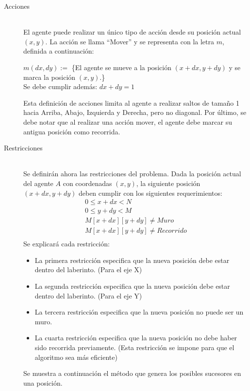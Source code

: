 \documentclass[letter, titlepage, 10pt]{article}
\begin{document}
\begin{description}
    \newpage  
    \item[Acciones] \hfill \\
  El agente puede realizar un único tipo de acción desde su posición actual $(x,y)$. La acción se llama ``Mover'' y se representa con la letra $m$, definida a continuación:
  \begin{center}
    $m(dx,dy) :=$ \{El agente se mueve a la posición $(x+dx,y+dy)$ y se marca la posición $(x,y)$.\}\\
    Se debe cumplir además: $dx + dy = 1$\\
  \end{center}
  Esta definición de acciones limita al agente a realizar saltos de tamaño 1 hacia Arriba, Abajo, Izquierda y Derecha, pero no diagonal. Por último, se debe notar que al realizar una acción mover, el agente debe marcar su antigua posición como recorrida.
  
  \item[Restricciones] \hfill \\
    Se definirán ahora las restricciones del problema. Dada la posición actual del agente $A$ con coordenadas $(x,y)$, la siguiente posición $(x+dx,y+dy)$  deben cumplir con los siguientes requerimientos:
  \begin{align}
    0 \leq x+dx < N\\
    0 \leq y+dy < M\\
    M[x+dx][y+dy] \neq Muro\\
    M[x+dx][y+dy] \neq Recorrido\\
  \end{align}
  Se explicará cada restricción:
  \begin{itemize}
    \item La primera restricción especifica que la nueva posición debe estar dentro del laberinto. (Para el eje X)
    \item La segunda restricción especifica que la nueva posición debe estar dentro del laberinto. (Para el eje Y)
    \item La tercera restricción especifica que la nueva posición no puede ser un muro.
    \item La cuarta restricción especifica que la nueva posición no debe haber sido recorrida previamente. (Esta restricción se impone para que el algoritmo sea más eficiente)
  \end{itemize}

Se muestra a continuación el método que genera los posibles sucesores en una posición.


\end{description}
\end{document}
